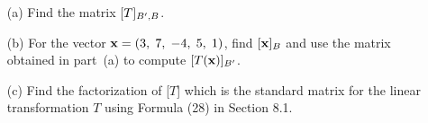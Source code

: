 \begin{exer}
\vspace{2mm}
\begin{enumerate}

\item[(a)]
Find the matrix $[T]_{\tiny{B}', \tiny{B}}$.
\vspace{1mm}
\item[(b)]
For the vector $\mathbf{x} = (3, \hspace{1mm} 7, \hspace{1mm} -4, \hspace{1mm} 5, \hspace{1mm} 1)$, find $[\mathbf{x}]_{\tiny{B}}$ and use the matrix obtained in part~(a) to compute $[T(\mathbf{x})]_{\tiny{B}'}$.
\vspace{1mm}
\item[(c)] Find the factorization of [$T$] which is the standard matrix for the linear transformation $T$ using Formula (28) in Section 8.1.
\end{enumerate}

\end{exer}

